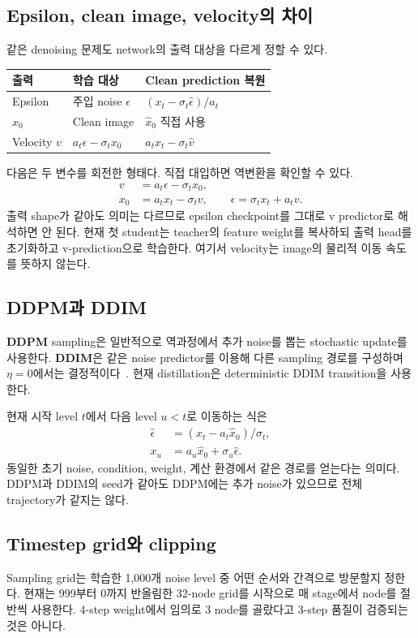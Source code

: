 \documentclass[11pt,a4paper]{article}
\begin{document}
\subsection{Epsilon, clean image, velocity의 차이}
같은 denoising 문제도 network의 출력 대상을 다르게 정할 수 있다.
\par\noindent
\begin{tabularx}{\linewidth}{lYY}
\toprule 출력 & 학습 대상 & Clean prediction 복원 \\\midrule
Epsilon & 주입 noise $\epsilon$ & $(x_t-\sigma_t\hat\epsilon)/a_t$ \\
$x_0$ & Clean image & $\hat x_0$ 직접 사용 \\
Velocity $v$ & $a_t\epsilon-\sigma_t x_0$ & $a_t x_t-\sigma_t\hat v$ \\
\bottomrule
\end{tabularx}
\par
다음은 두 변수를 회전한 형태다. 직접 대입하면 역변환을 확인할 수 있다.
\begin{align}
v&=a_t\epsilon-\sigma_t x_0,\\
x_0&=a_t x_t-\sigma_t v,\qquad \epsilon=\sigma_t x_t+a_t v.
\end{align}
출력 shape가 같아도 의미는 다르므로 epsilon checkpoint를 그대로 v predictor로 해석하면 안 된다. 현재 첫 student는 teacher의 feature weight를 복사하되 출력 head를 초기화하고 v-prediction으로 학습한다. 여기서 velocity는 image의 물리적 이동 속도를 뜻하지 않는다.

\subsection{DDPM과 DDIM}
\textbf{DDPM} sampling은 일반적으로 역과정에서 추가 noise를 뽑는 stochastic update를 사용한다. \textbf{DDIM}은 같은 noise predictor를 이용해 다른 sampling 경로를 구성하며 $\eta=0$에서는 결정적이다~\cite{ddim}. 현재 distillation은 deterministic DDIM transition을 사용한다.

현재 시작 level $t$에서 다음 level $u<t$로 이동하는 식은
\begin{align}
\hat\epsilon&=(x_t-a_t\hat x_0)/\sigma_t,\\
x_u&=a_u\hat x_0+\sigma_u\hat\epsilon.
\label{eq:ddim}
\end{align}
동일한 초기 noise, condition, weight, 계산 환경에서 같은 경로를 얻는다는 의미다. DDPM과 DDIM의 seed가 같아도 DDPM에는 추가 noise가 있으므로 전체 trajectory가 같지는 않다.

\subsection{Timestep grid와 clipping}
Sampling grid는 학습한 1,000개 noise level 중 어떤 순서와 간격으로 방문할지 정한다. 현재는 999부터 0까지 반올림한 32-node grid를 시작으로 매 stage에서 node를 절반씩 사용한다. 4-step weight에서 임의로 3 node를 골랐다고 3-step 품질이 검증되는 것은 아니다.
\end{document}

